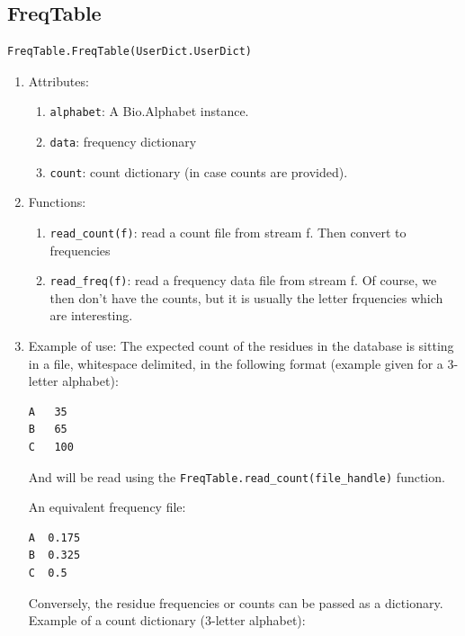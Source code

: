 \documentclass{report}
\begin{document}
\subsection{FreqTable}
\label{sec:freq_table}

\begin{verbatim}
FreqTable.FreqTable(UserDict.UserDict)
\end{verbatim}

\begin{enumerate}

  \item Attributes:
 

  \begin{enumerate}
    \item \verb|alphabet|: A Bio.Alphabet instance.
    \item \verb|data|: frequency dictionary
    \item \verb|count|: count dictionary (in case counts are provided).
  \end{enumerate}

  \item Functions:
  \begin{enumerate}
    \item \verb|read_count(f)|: read a count file from stream f. Then convert to frequencies
    \item \verb|read_freq(f)|: read a frequency data file from stream f. Of course, we then don't have the counts, but it is usually the letter frquencies which are interesting.
  \end{enumerate}

  \item Example of use:
  The expected count of the residues in the database is sitting in a file, whitespace delimited, in the following format (example given for a 3-letter alphabet):

\begin{verbatim}
A   35
B   65
C   100
\end{verbatim}

And will be read using the \verb|FreqTable.read_count(file_handle)| function.

An equivalent frequency file:

\begin{verbatim}
A  0.175
B  0.325
C  0.5
\end{verbatim}

Conversely, the residue frequencies or counts can be passed as a dictionary.
Example of a count dictionary (3-letter alphabet):


\end{enumerate}
\end{document}
